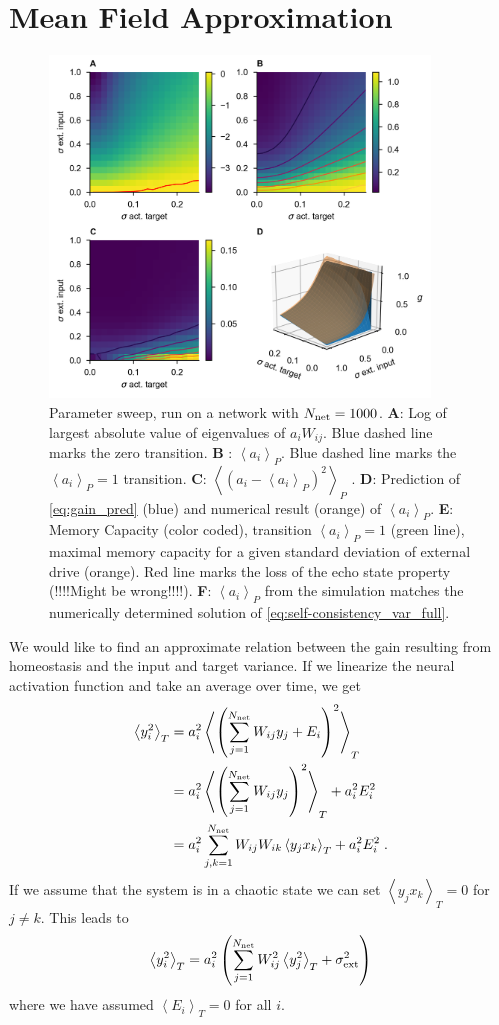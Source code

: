 \documentclass[10pt,a4paper]{article}
\newcommand{\avgt}[1]{\left< #1 \right>_T}
\newcommand{\avgp}[1]{\left< #1 \right>_P}
\begin{document}
\section{Mean Field Approximation}

\begin{figure}[t]
	\centering
	\includegraphics[width=0.9\textwidth]{../plots/std_in_std_target_sweep_fig.png}
	\caption{Parameter sweep, run on a network with $N_{\rm net}=1000$. {\bf A}: Log of largest absolute value of eigenvalues of $a_i W_{ij}$. Blue dashed line marks the zero transition. {\bf B} : $\avgp{a_i}$.  Blue dashed line marks the $\avgp{a_i} = 1$ transition. {\bf C}: $\avgp{(a_i - \avgp{a_i})^2}$ . {\bf D}: Prediction of \eqref{eq:gain_pred} (blue) and numerical result (orange) of $\avgp{a_i}$. {\bf E}: Memory Capacity (color coded), transition $\avgp{a_i} = 1$ (green line), maximal memory capacity for a given standard deviation of external drive (orange). Red line marks the loss of the echo state property (!!!!Might be wrong!!!!). {\bf F}: $\avgp{a_i}$ from the simulation matches the numerically determined solution of \eqref{eq:self-consistency_var_full}.}
	\label{fig:gain_std_in_std_targ_sweep}
\end{figure} 

We would like to find an approximate relation between the gain resulting from homeostasis and the input and target variance. If we linearize the neural activation function and take an average over time, we get
\begin{align}
	\avgt{y_i^2} &= a_i^2 \avgt{\left(\sum_{j=1}^{N_{\rm net}} W_{ij} y_j + E_i\right)^2} \label{eq:time_avg_act_var}\\
	&= a_i^2 \avgt{\left( \sum_{j=1}^{N_{\rm net}} W_{ij} y_j \right)^2} + a_i^2 E_i^2 \\
	&= a_i^2 \sum_{j,k=1}^{N_{\rm net}} W_{ij}W_{ik} \avgt{y_j x_k} + a_i^2 E_i^2 \; .
\end{align}
If we assume that the system is in a chaotic state we can set $\avgt{y_j x_k}=0$ for $j\neq k$. This leads to
\begin{equation}
	\avgt{y_i^2} = a_i^2 \left( \sum_{j=1}^{N_{\rm net}} W_{ij}^2 \avgt{y_j^2} + \sigma_{\rm ext}^2 \right)
\end{equation}
where we have assumed $\avgt{E_i} = 0$ for all $i$.
\end{document}
